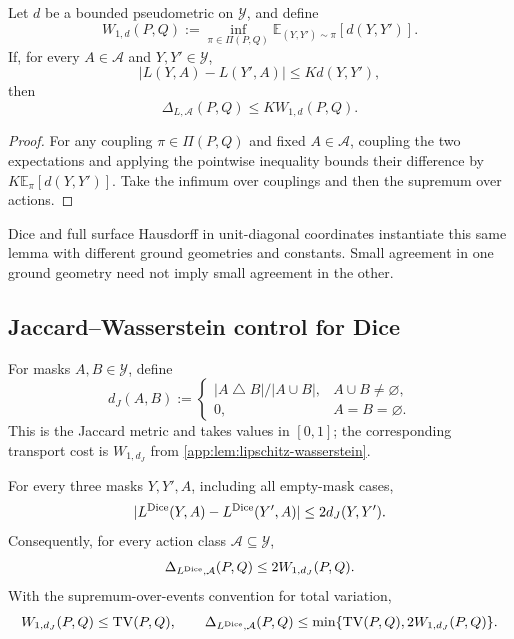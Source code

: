 \begin{lemma}
\label{app:lem:lipschitz-wasserstein}
Let $d$ be a bounded pseudometric on $\mathcal Y$, and define
\begin{equation*}
  W_{1,d}(P,Q):=\inf_{\pi\in\Pi(P,Q)}
  \mathbb E_{(Y,Y')\sim\pi}[d(Y,Y')].
\end{equation*}
If, for every $A\in\mathcal A$ and $Y,Y'\in\mathcal Y$,
\begin{equation*}
  |L(Y,A)-L(Y',A)|\leq Kd(Y,Y'),
\end{equation*}
then
\begin{equation*}
  \Delta_{L,\mathcal A}(P,Q)\leq K W_{1,d}(P,Q).
\end{equation*}
\end{lemma}

\begin{proof}
For any coupling $\pi\in\Pi(P,Q)$ and fixed $A\in\mathcal A$, coupling the two
expectations and applying the pointwise inequality bounds their difference by
$K\mathbb E_\pi[d(Y,Y')]$. Take the infimum over couplings and then the
supremum over actions.
\end{proof}

Dice and full surface Hausdorff in unit-diagonal coordinates instantiate this same lemma
with different ground geometries and constants. Small agreement in one ground
geometry need not imply small agreement in the other.

\subsection{Jaccard--Wasserstein control for Dice}

For masks $A,B\in\mathcal Y$, define
\begin{equation*}
  d_J(A,B)
  :=
  \begin{cases}
    |A\mathbin{\triangle}B|/|A\cup B|,&A\cup B\neq\varnothing,\\
    0,&A=B=\varnothing.
  \end{cases}
\end{equation*}
This is the Jaccard metric and takes values in $[0,1]$; the corresponding
transport cost is $W_{1,d_J}$ from
\cref{app:lem:lipschitz-wasserstein}.

\begin{lemma}
\label{app:lem:dice-jaccard}
For every three masks $Y,Y',A$, including all empty-mask cases,
\begin{equation*}
  |L^{\operatorname{Dice}}(Y,A)-L^{\operatorname{Dice}}(Y',A)|
  \leq 2d_J(Y,Y').
\end{equation*}
Consequently, for every action class $\mathcal A\subseteq\mathcal Y$,
\begin{equation*}
  \Delta_{L^{\operatorname{Dice}},\mathcal A}(P,Q)
  \leq 2W_{1,d_J}(P,Q).
\end{equation*}
With the supremum-over-events convention for total variation,
\begin{equation*}
  W_{1,d_J}(P,Q)\leq\operatorname{TV}(P,Q),
  \qquad
  \Delta_{L^{\operatorname{Dice}},\mathcal A}(P,Q)
  \leq\min\{\operatorname{TV}(P,Q),2W_{1,d_J}(P,Q)\}.
\end{equation*}
\end{lemma}

